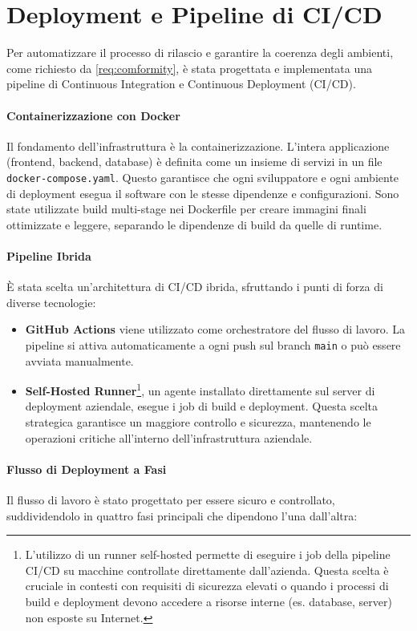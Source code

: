 \documentclass[12pt,a4paper,openright,twoside]{book}
\begin{document}
\section{Deployment e Pipeline di CI/CD}
\label{sec:ci_cd}
Per automatizzare il processo di rilascio e garantire la coerenza degli ambienti, come richiesto da \ref{req:comformity}, è stata progettata e implementata una pipeline di Continuous Integration e Continuous Deployment (CI/CD).

\paragraph{Containerizzazione con Docker}
Il fondamento dell'infrastruttura è la containerizzazione. L'intera applicazione (frontend, backend, database) è definita come un insieme di servizi in un file \texttt{docker-compose.yaml}. Questo garantisce che ogni sviluppatore e ogni ambiente di deployment esegua il software con le stesse dipendenze e configurazioni. Sono state utilizzate build multi-stage nei Dockerfile per creare immagini finali ottimizzate e leggere, separando le dipendenze di build da quelle di runtime.

\paragraph{Pipeline Ibrida}
È stata scelta un'architettura di CI/CD ibrida, sfruttando i punti di forza di diverse tecnologie:
\begin{itemize}
    \item \textbf{GitHub Actions} viene utilizzato come orchestratore del flusso di lavoro. La pipeline si attiva automaticamente a ogni push sul branch \texttt{main} o può essere avviata manualmente.
    \item \textbf{Self-Hosted Runner}\footnote{L'utilizzo di un runner self-hosted permette di eseguire i job della pipeline CI/CD su macchine controllate direttamente dall'azienda. Questa scelta è cruciale in contesti con requisiti di sicurezza elevati o quando i processi di build e deployment devono accedere a risorse interne (es. database, server) non esposte su Internet.}, un agente installato direttamente sul server di deployment aziendale, esegue i job di build e deployment. Questa scelta strategica garantisce un maggiore controllo e sicurezza, mantenendo le operazioni critiche all'interno dell'infrastruttura aziendale.
\end{itemize}

\paragraph{Flusso di Deployment a Fasi} Il flusso di lavoro è stato progettato per essere sicuro e controllato, suddividendolo in quattro fasi principali che dipendono l'una dall'altra:
\end{document}
